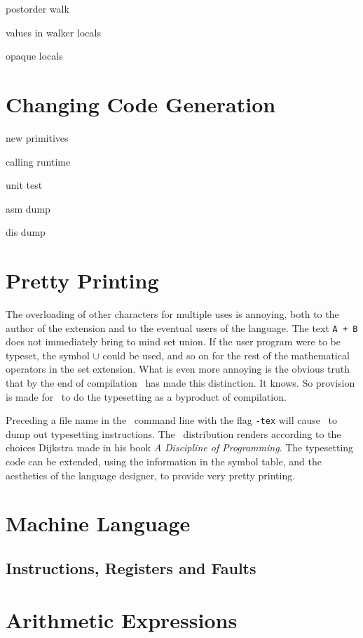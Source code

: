 postorder walk

values in walker locals

opaque locals

\section{Changing Code Generation}

new primitives

calling runtime

unit test

asm dump

dis dump

\section{Pretty Printing}

The overloading of other  characters for multiple uses is annoying, both to the author of the extension and to the eventual users of the language.
The text {\tt A + B} does not immediately bring to mind set union.  If the user program were to be typeset, the symbol $\cup$ could be used, and so on for the rest of the mathematical operators in the set extension.  What is even more annoying is the obvious truth that by the end of compilation \xcom\ has made this distinction.  It knows.  So provision is made for \xcom\ to do the typesetting as a byproduct of compilation.

Preceding a file name in the \xcom\ command line with the flag {\tt -tex} will cause \xcom\ to dump out  typesetting instructions.  The \xcom\ distribution renders  according to the choices Dijkstra made in his book {\em A Discipline of Programming}.  The typesetting code can be extended, using the information in the symbol table, and the aesthetics of the language designer, to provide very pretty printing.

\section{Machine Language}
\subsection{Instructions, Registers and Faults}

\section{Arithmetic Expressions}
